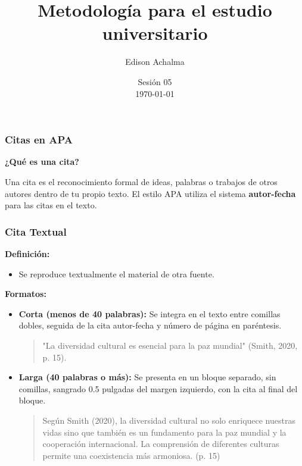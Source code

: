 \documentclass[
11pt, %
]{beamer}
\title[Metodología de Investigación]{Metodología para el estudio universitario} %
\author[Edison Achalma]{Edison Achalma} %
\institute[CAU - UNSCH]{Corporación Académica Universitaria CAU - UNSCH \\ \smallskip \textit{achalmed.18@gmail.com}} %
\date[\today]{Sesión 05 \\ \today} %
\begin{document}
\begin{frame}
	\titlepage
\end{frame}



\begin{frame}
	\frametitle{Citas en APA}

	\textbf{¿Qué es una cita?}

	Una cita es el reconocimiento formal de ideas, palabras o trabajos de otros autores dentro de tu propio texto. El estilo APA utiliza el sistema \textbf{autor-fecha} para las citas en el texto.

\end{frame}

\begin{frame}
	\frametitle{Cita Textual}

	\textbf{Definición:}
	\begin{itemize}
		\item Se reproduce textualmente el material de otra fuente.
	\end{itemize}

	\textbf{Formatos:}
	\begin{itemize}
		\item \textbf{Corta (menos de 40 palabras):} Se integra en el texto entre comillas dobles, seguida de la cita autor-fecha y número de página en paréntesis.
		      \begin{quote}
			      "La diversidad cultural es esencial para la paz mundial" (Smith, 2020, p. 15).
		      \end{quote}
		\item \textbf{Larga (40 palabras o más):} Se presenta en un bloque separado, sin comillas, sangrado 0.5 pulgadas del margen izquierdo, con la cita al final del bloque.
		      \begin{quote}
			      Según Smith (2020), la diversidad cultural no solo enriquece nuestras vidas sino que también es un fundamento para la paz mundial y la cooperación internacional. La comprensión de diferentes culturas permite una coexistencia más armoniosa. (p. 15)
		      \end{quote}
	\end{itemize}
\end{frame}
\end{document}
